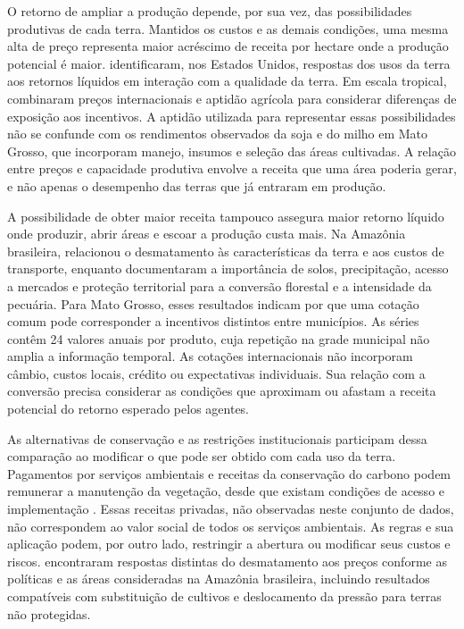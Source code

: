 O retorno de ampliar a produção depende, por sua vez, das possibilidades produtivas de cada terra. Mantidos os custos e as demais condições, uma mesma alta de preço representa maior acréscimo de receita por hectare onde a produção potencial é maior.  identificaram, nos Estados Unidos, respostas dos usos da terra aos retornos líquidos em interação com a qualidade da terra. Em escala tropical,  combinaram preços internacionais e aptidão agrícola para considerar diferenças de exposição aos incentivos. A aptidão utilizada para representar essas possibilidades não se confunde com os rendimentos observados da soja e do milho em Mato Grosso, que incorporam manejo, insumos e seleção das áreas cultivadas. A relação entre preços e capacidade produtiva envolve a receita que uma área poderia gerar, e não apenas o desempenho das terras que já entraram em produção.

A possibilidade de obter maior receita tampouco assegura maior retorno líquido onde produzir, abrir áreas e escoar a produção custa mais. Na Amazônia brasileira,  relacionou o desmatamento às características da terra e aos custos de transporte, enquanto  documentaram a importância de solos, precipitação, acesso a mercados e proteção territorial para a conversão florestal e a intensidade da pecuária. Para Mato Grosso, esses resultados indicam por que uma cotação comum pode corresponder a incentivos distintos entre municípios. As séries contêm 24 valores anuais por produto, cuja repetição na grade municipal não amplia a informação temporal. As cotações internacionais não incorporam câmbio, custos locais, crédito ou expectativas individuais. Sua relação com a conversão precisa considerar as condições que aproximam ou afastam a receita potencial do retorno esperado pelos agentes.

As alternativas de conservação e as restrições institucionais participam dessa comparação ao modificar o que pode ser obtido com cada uso da terra. Pagamentos por serviços ambientais e receitas da conservação do carbono podem remunerar a manutenção da vegetação, desde que existam condições de acesso e implementação \cite{Angelsen2010}. Essas receitas privadas, não observadas neste conjunto de dados, não correspondem ao valor social de todos os serviços ambientais. As regras e sua aplicação podem, por outro lado, restringir a abertura ou modificar seus custos e riscos.  encontraram respostas distintas do desmatamento aos preços conforme as políticas e as áreas consideradas na Amazônia brasileira, incluindo resultados compatíveis com substituição de cultivos e deslocamento da pressão para terras não protegidas.

